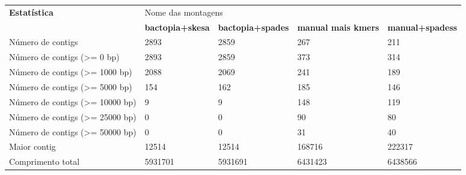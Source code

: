 \begin{table}[htb]
{\begin{tabular}{lllll}
		\toprule
		\textbf{Estatística} & \multicolumn{3}{l}{Nome das montagens}                                                                                                                       &                                 \\
		\cmidrule{2-5}
		                         & \textbf{bactopia+skesa} & \textbf{bactopia+spades} & \textbf{manual mais kmers} & \textbf{manual+spadess}\\
		\midrule
		Número de contigs                            & 2893                                   & 2859                                    & 267                               & 211                                         \\
		Número de contigs (\textgreater{}= 0 bp)     & 2893                                   & 2859                                    & 373                               & 314                                        \\
		Número de contigs (\textgreater{}= 1000 bp)  & 2088                                   & 2069                                    & 241                               & 189                                       \\
		Número de contigs (\textgreater{}= 5000 bp)  & 154                                    & 162                                     & 185                               & 146                                        \\
		Número de contigs (\textgreater{}= 10000 bp) & 9                                      & 9                                       & 148                               & 119                                        \\
		Número de contigs (\textgreater{}= 25000 bp) & 0                                      & 0                                       & 90                                & 80                                          \\
		Número de contigs (\textgreater{}= 50000 bp) & 0                                      & 0                                       & 31                                & 40                                       \\
		Maior contig                                 & 12514                                  & 12514                                   & 168716                            & 222317                                                           \\
		Comprimento total                            & 5931701                                & 5931691                                 & 6431423                           & 6438566                                                      \\

\end{tabular}}
\end{table}
